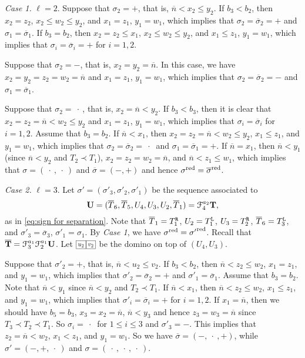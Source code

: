 \documentclass[leqno,11pt]{amsart}
\numberwithin{equation}{section}
\newcommand{\ov}{\overline}
\newcommand{\mc}{\mathcal}
\begin{document}
{\em Case 1.} $\ell=2$.  
Suppose that $\sigma_2=+$, that is, $\ov n < x_2\leq y_2$. 
%
If $b_3< b_2$, then 
$x_2=z_2$, $x_2\leq w_2\leq y_2$, and $x_1=z_1$, $y_1=w_1$, which implies that $\sigma_2=\ov\sigma_2=+$ and $\sigma_1=\ov\sigma_1$.
%
If $b_3=b_2$, then $x_2=z_2\leq x_1$, $x_2\leq w_2\leq y_2$, and $x_1\leq z_1$, $y_1=w_1$, which implies that $\sigma_i=\ov\sigma_i=+$ for $i=1,2$.
%

Suppose that $\sigma_2=-$, that is, $x_2 = y_2=\ov n$. 
%
In this case, we have $x_2=y_2=z_2=w_2=\ov n$ and $x_1=z_1$, $y_1=w_1$, which implies that 
$\sigma_2=\ov\sigma_2=-$ and $\sigma_1=\ov\sigma_1$.

Suppose that $\sigma_2=\ \cdot\ $, that is, $x_2 =\ov n<y_2$.
%
If $b_3<b_3$, then it is clear that $x_2=z_2=\ov n<w_2\leq y_2$ and $x_1=z_1$, $y_1=w_1$, which implies that $\sigma_i=\ov\sigma_i$ for $i=1,2$. 
%
Assume that $b_3=b_2$.
%
If $\ov n< x_1$, then $x_2=z_2=\ov n<w_2\leq y_2$, $x_1\leq z_1$, and $y_1=w_1$, which implies that $\sigma_2=\ov\sigma_2=\ \cdot\ $ and $\sigma_1=\ov\sigma_1=+$. 
%
If $\ov n=x_1$, then $\ov n < y_1$ (since $\ov n< y_2$ and $T_2\prec T_1$), $x_2=z_2=w_2=\ov n$, and $\ov n< z_1\leq w_1$, which implies that $\sigma=(\ \cdot\ , \ \cdot\ )$ and $\ov\sigma = (-,+)$ and hence $\sigma^{\rm red}=\ov{\sigma}^{\rm red}$.
%
\vskip 2mm


{\em Case 2.} $\ell=3$. Let $\sigma'=(\sigma'_3,\sigma'_2,\sigma'_1)$ be the sequence associated to 
\begin{equation*}
{\bf U}=(\ov{T}_6,\ov{T}_5,U_4,U_3,U_2,\ov{T}_1) = \mc{F}^{a_2}_4 {\bf T},
\end{equation*}
as in \eqref{eq:sign for separation}. 
Note that $\ov{T}_1={T}^{\tt R}_1$, $U_2={T}^{\tt L}_1$, $U_3=T^{\tt R}_2$, $\ov{T}_6=T^{\tt L}_3$, and $\sigma'_3=\ov{\sigma}_3$, $\sigma'_1={\sigma}_1$. 
%
By {\em Case 1}, we have 
$\sigma^{\rm red}={\sigma'}^{\rm red}$. 
%
Recall that $\ov{\bf T}=\mc{F}^{a_1}_3\mc{F}^{a_1}_2{\bf U}$.
%
Let
$\resizebox{.07\hsize}{!}{\def\lr#1{\multicolumn{1}{|@{\hspace{.6ex}}c@{\hspace{.6ex}}|}{\raisebox{.0ex}{$#1$}}}\raisebox{-.65ex}
{$\begin{array}[b]{cc}
\cline{1-1}\cline{2-2}
\lr{u_2}&\lr{v_2}\\
\cline{1-1}\cline{2-2}
\end{array}$}}$
be the domino on top of $(U_4,U_3)$. 


Suppose that $\sigma'_2=+$, that is, $\ov n < u_2\leq v_2$. 
%
If $b_3<b_2$, then $\ov n < z_2\leq w_2$, $x_1=z_1$, and $y_1=w_1$, which implies  
that $\sigma'_2=\ov\sigma_2=+$ and $\sigma'_1=\ov\sigma_1$. 
%
Assume that $b_3=b_2$. Note that $\ov n< y_1$ since $\ov n< y_2$ and $T_2\prec T_1$.
%
If $\ov n< x_1$, then $\ov n < z_2\leq w_2$, $x_1\leq z_1$, and $y_1= w_1$, which implies that $\sigma'_i=\ov\sigma_i=+$ for $i=1,2$.
%
If $x_1=\ov n$, then we should have $b_5=b_3$, $x_3=x_2=\ov n$, $\ov{n}<y_3$ and hence $z_3=w_3=\ov{n}$ since $T_3\prec T_2\prec T_1$. 
So $\sigma_i=\ \cdot \ $ for $1\leq i\leq 3$ and $\sigma'_3=-$. 
This implies that $z_2=\ov{n}<w_2$, $x_1< z_1$, and $y_1= w_1$.
So we have $\ov{\sigma}=(-,\ \cdot\ , +)$, while $\sigma'=(-, +,\ \cdot\ )$ and $\sigma=(\ \cdot\ ,\ \cdot\ ,\ \cdot\ )$.
%
\end{document}
